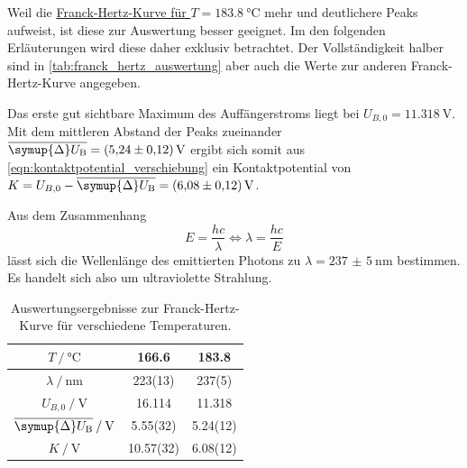 Weil die \hyperref[fig:franck_hertz_kurve_2]{Franck-Hertz-Kurve für $T = \SI{183.8}{\celsius}$}
mehr und deutlichere Peaks aufweist,
ist diese zur Auswertung besser geeignet.
Im den folgenden Erläuterungen wird diese daher exklusiv betrachtet.
Der Vollständigkeit halber sind in \autoref{tab:franck_hertz_auswertung}
aber auch die Werte zur anderen Franck-Hertz-Kurve angegeben.


Das erste gut sichtbare Maximum des Auffängerstroms liegt bei $U_{B,0} = \SI{11.318}{\volt}$.
Mit dem mittleren Abstand der Peaks zueinander $\overline{\symup{\Delta}U_\text{B}} = \SI{5.24(12)}{\volt}$
ergibt sich somit aus \autoref{eqn:kontaktpotential_verschiebung}
ein Kontaktpotential von $K = U_{B,0} - \overline{\symup{\Delta}U_\text{B}} = \SI{6.08(12)}{\volt}$.

Aus dem Zusammenhang
\[
  E = \frac{hc}{\lambda} \Leftrightarrow
  \lambda = \frac{hc}{E}
\]
lässt sich die Wellenlänge des emittierten Photons
zu $\lambda = \SI{237(5)}{\nano\meter}$ bestimmen.
Es handelt sich also um ultraviolette Strahlung.


\begin{table}
  \centering
  \caption{Auswertungsergebnisse zur Franck-Hertz-Kurve für verschiedene Temperaturen.}
  \label{tab:franck_hertz_auswertung}
  \begin{tabular}{c | S S}
  \toprule
  {$T \mathbin{/} \si{\celsius}$} &
  166.6 & 183.8 \\
  \midrule
  $\lambda \mathbin{/} \si{\nano\meter}$ & 223(13) & 237(5) \\
  $U_{B,0} \mathbin{/} \si{\volt}$ & 16.114 & 11.318 \\
  $\overline{\symup{\Delta}U_\text{B}} \mathbin{/} \si{\volt}$ & 5.55(32) & 5.24(12) \\
  $K \mathbin{/} \si{\volt}$ & 10.57(32) & 6.08(12) \\
  \bottomrule
  \end{tabular}
\end{table}
